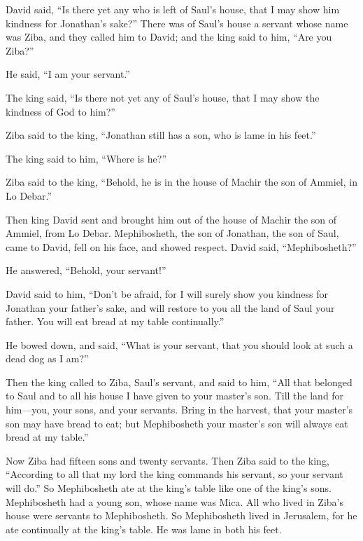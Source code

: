  David said, ``Is there yet any who is left of Saul's
house, that I may show him kindness for Jonathan's sake?''
 There was of Saul's house a servant whose name was Ziba,
and they called him to David; and the king said to him, ``Are you
Ziba?''

He said, ``I am your servant.''

 The king said, ``Is there not yet any of Saul's house,
that I may show the kindness of God to him?''

Ziba said to the king, ``Jonathan still has a son, who is lame in his
feet.''

 The king said to him, ``Where is he?''

Ziba said to the king, ``Behold, he is in the house of Machir the son of
Ammiel, in Lo Debar.''

 Then king David sent and brought him out of the house of
Machir the son of Ammiel, from Lo Debar.  Mephibosheth,
the son of Jonathan, the son of Saul, came to David, fell on his face,
and showed respect. David said, ``Mephibosheth?''

He answered, ``Behold, your servant!''

 David said to him, ``Don't be afraid, for I will surely
show you kindness for Jonathan your father's sake, and will restore to
you all the land of Saul your father. You will eat bread at my table
continually.''

 He bowed down, and said, ``What is your servant, that you
should look at such a dead dog as I am?''

 Then the king called to Ziba, Saul's servant, and said to
him, ``All that belonged to Saul and to all his house I have given to
your master's son.  Till the land for him---you, your
sons, and your servants. Bring in the harvest, that your master's son
may have bread to eat; but Mephibosheth your master's son will always
eat bread at my table.''

Now Ziba had fifteen sons and twenty servants.  Then Ziba
said to the king, ``According to all that my lord the king commands his
servant, so your servant will do.'' So Mephibosheth ate at the king's
table like one of the king's sons.  Mephibosheth had a
young son, whose name was Mica. All who lived in Ziba's house were
servants to Mephibosheth.  So Mephibosheth lived in
Jerusalem, for he ate continually at the king's table. He was lame in
both his feet.

